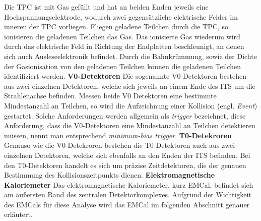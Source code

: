 Die TPC ist mit Gas gef\"ullt und hat an beiden Enden jeweils eine Hochspannungselektrode, wodurch zwei gegens\"atzliche elektrische Felder im inneren der TPC vorliegen.
Fliegen geladene Teilchen durch die TPC, so ionisieren die geladenen Teilchen das Gas.
Das ionisierte Gas wiederum wird durch das elektrische Feld in Richtung der Endplatten beschleunigt, an denen sich auch Ausleseelektronik befindet.
Durch die Bahnkr\"ummung, sowie der Dichte der Gasionisation von den geladenen Teilchen k\"onnen die geladenen Teilchen identifiziert werden. \cite{PAPER:2}
\newline
\textbf{V0-Detektoren}
\newline
Die sogenannte V0-Detektoren bestehen aus zwei einzelnen Detektoren, welche sich jeweils an einem Ende des ITS um die Strahlenachse befinden.
Messen beide V0 Detektoren eine bestimmte Mindestanzahl an Teilchen, so wird die Aufzeichnung einer Kollision (engl. \textit{Event}) gestartet.
Solche Anforderungen werden allgemein als \textit{trigger} bezeichnet, diese Anforderung, dass die V0-Detektoren eine Mindestanzahl an Teilchen detektieren m\"ussen, nennt man entsprechend \textit{minimum-bias trigger}.
\newline
\textbf{T0-Detekroren}
\newline
Genauso wie die V0-Detekroren bestehen die T0-Detektoren auch aus zwei einzelnen Detektoren, welche sich ebenfalls an den Enden der ITS befinden.
Bei den T0-Detektoren handelt es sich um pr\"azise Zeitdetektoren, die der genauen Bestimmung des Kollisionszeitpunkts dienen.
\newline
\textbf{Elektromagnetische Kaloriemeter}
\newline
Das elektromagnetische Kaloriemeter, kurz EMCal, befindet sich am \"au{\ss}ersten Rand des zentralen Detektorkomplexes.
Aufgrund der Wichtigkeit des EMCals f\"ur diese Analyse wird das EMCal im folgenden Abschnitt genauer erl\"autert.